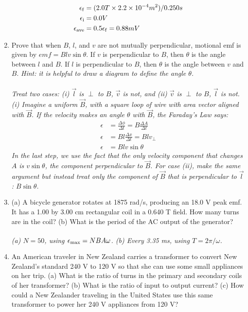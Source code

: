 \documentclass[12pt,twocolumn]{article}
\begin{document}
\begin{enumerate}
\begin{align}
\epsilon_{\rm f} &= (2.0 T \times 2.2\times 10^{-4} m^2)/0.250 s \\
\epsilon_{\rm i} &= 0.0 V \\
\epsilon_{\rm ave} &= 0.5\epsilon_{\rm f} = 0.88 mV
\end{align}
\item Prove that when $B$, $l$, and $v$ are not mutually perpendicular, motional emf is given by $emf = Blv\sin\theta$. If $v$ is perpendicular to $B$, then $\theta$ is the angle between $l$ and $B$. If $l$ is perpendicular to $B$, then $\theta$ is the angle between $v$ and $B$. \textit{Hint: it is helpful to draw a diagram to define the angle $\theta$.} \\ \\
\textit{Treat two cases: (i) $\vec{l}$ is $\perp$ to ${B}$, $\vec{v}$ is not, and (ii) $\vec{v}$ is $\perp$ to ${B}$, $\vec{l}$ is not.  (i) Imagine a uniform $\vec{B}$, with a square loop of wire with area vector aligned with $\vec{B}$.  If the velocity makes an angle $\theta$ with $\vec{B}$, the Faraday's Law says:
\begin{align}
\epsilon &= \frac{\Delta \phi}{\Delta t} = B \frac{\Delta A}{\Delta t} \\
\epsilon &= B l \frac{\Delta x}{\Delta t} = B l v_{\perp} \\
\epsilon &= B l v \sin\theta
\end{align}
In the last step, we use the fact that the only velocity component that changes $A$ is $v\sin\theta$, the component perpendicular to $\vec{B}$.  For case (ii), make the same argument but instead treat only the component of $\vec{B}$ that is perpendicular to $\vec{l}$: $B\sin\theta$.}
\item (a) A bicycle generator rotates at 1875 rad/s, producing an 18.0 V peak emf. It has a 1.00 by 3.00 cm rectangular coil in a 0.640 T field. How many turns are in the coil? (b) What is the period of the AC output of the generator?  \\ \\
\textit{(a) $N = 50$, using $\epsilon_{\rm max} = N B A \omega$. (b) Every 3.35 ms, using $T = 2\pi/\omega$.}
\item An American traveler in New Zealand carries a transformer to convert New Zealand's standard 240 V to 120 V so that she can use some small appliances on her trip. (a) What is the ratio of turns in the primary and secondary coils of her transformer? (b) What is the ratio of input to output current? (c) How could a New Zealander traveling in the United States use this same transformer to power her 240 V appliances from 120 V? \\ \\

\end{enumerate}
\end{document}
